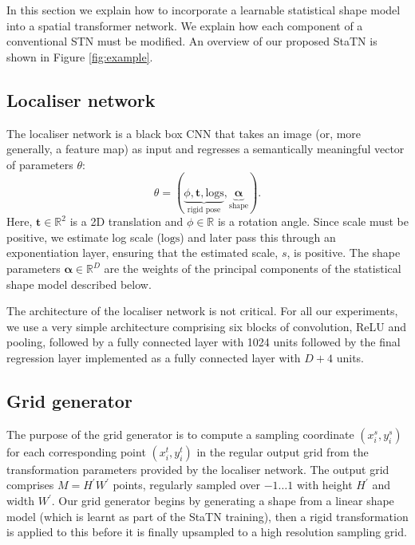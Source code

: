 \documentclass[runningheads]{llncs}
\newcommand{\R}{\mathbb{R}}
\newcommand{\logs}{\textrm{logs}}
\begin{document}
In this section we explain how to incorporate a learnable statistical shape model into a spatial transformer network. We explain how each component of a conventional STN must be modified. An overview of our proposed StaTN is shown in Figure \ref{fig:example}.

\subsection{Localiser network}

The localiser network is a black box CNN that takes an image (or, more generally, a feature map) as input and regresses a semantically meaningful vector of parameters $\theta$:
\begin{equation}
    \theta = (\underbrace{\phi,\mathbf{t},\logs}_{\textrm{rigid pose}},\underbrace{{\bm \alpha}}_{\textrm{shape}}).
\end{equation}
Here, $\mathbf{t}\in\R^2$ is a 2D translation and $\phi\in\R$ is a rotation angle. Since scale must be positive, we estimate log scale ($\logs$) and later pass this through an exponentiation layer, ensuring that the estimated scale, $s$, is positive. The shape parameters ${\bm \alpha}\in\R^D$ are the weights of the principal components of the statistical shape model described below.

The architecture of the localiser network is not critical. For all our experiments, we use a very simple architecture comprising six blocks of convolution, ReLU and pooling, followed by a fully connected layer with 1024 units followed by the final regression layer implemented as a fully connected layer with $D+4$ units.

\subsection{Grid generator}

The purpose of the grid generator is to compute a sampling coordinate $(x_i^s,y_i^s)$ for each corresponding point $(x_i^t,y_i^t)$ in the regular output grid from the transformation parameters provided by the localiser network. The output grid comprises $M=H^{\prime}W^{\prime}$ points, regularly sampled over $-1\dots 1$ with height $H^{\prime}$ and width $W^{\prime}$. Our grid generator begins by generating a shape from a linear shape model (which is learnt as part of the StaTN training), then a rigid transformation is applied to this before it is finally upsampled to a high resolution sampling grid.
\end{document}
